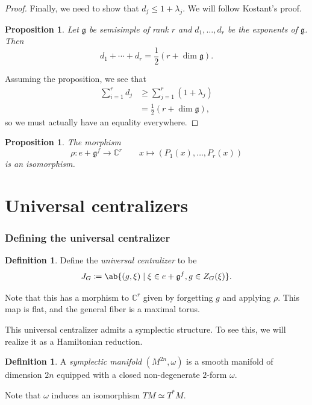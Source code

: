 \documentclass{amsart}
\newtheorem{prop}[thm]{Proposition}
\theoremstyle{definition}
\newtheorem{defn}[thm]{Definition}
\theoremstyle{remark}
\theoremstyle{plain}
\theoremstyle{definition}
\theoremstyle{remark}
\newcommand{\C}{\mathbb{C}}
\newcommand{\g}{\mathfrak{g}}
\newcommand{\1}{\mathbf{1}}
\newcommand{\2}{\mathbf{2}}
\newcommand{\3}{\mathbf{3}}
\begin{document}
\begin{proof}
    Finally, we need to show that \(d_j \leq 1 + \lambda_j\). We will follow Kostant's proof.
    \begin{prop}
        Let \(\g\) be semisimple of rank \(r\) and \(d_1, \ldots, d_r\) be the exponents of \(\g\). Then
        \[ d_1 + \cdots + d_r = \frac{1}{2} (r + \dim \g). \]
    \end{prop}
    Assuming the proposition, we see that
    \begin{align*}
        \sum_{i=1}^r d_j &\geq \sum_{j=1}^r (1 + \lambda_j) \\
        &= \frac{1}{2} (r + \dim \g),
    \end{align*}
    so we must actually have an equality everywhere.
\end{proof}

\begin{prop}
    The morphism
    \[ \rho \colon e + \g^f \to \C^r \qquad x \mapsto (P_1(x), \ldots, P_r(x)) \]
    is an isomorphism.
\end{prop}





\part{Universal centralizers}

\section{Defining the universal centralizer}%
\label{sec:Basics}


\begin{defn}
    Define the \textit{universal centralizer} to be
    \[ J_G \coloneqq \ab\{ (g, \xi) \mid \xi \in e + \g^f, g \in Z_G(\xi) \}. \]
\end{defn}

Note that this has a morphism to \(\C^r\) given by forgetting \(g\) and applying \(\rho\). This map is flat, and the general fiber is a maximal torus.

This universal centralizer admits a symplectic structure. To see this, we will realize it as a Hamiltonian reduction.

\begin{defn}
    A \textit{symplectic manifold} \((M^{2n}, \omega)\) is a smooth manifold of dimension \(2n\) equipped with a closed non-degenerate \(2\)-form \(\omega\).
\end{defn}

Note that \(\omega\) induces an isomorphism \(TM \simeq T^* M\).
\end{document}
